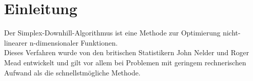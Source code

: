 \section{Einleitung}
Der Simplex-Downhill-Algorithmus ist eine Methode zur Optimierung nicht-linearer n-dimensionaler Funktionen. \\
Dieses Verfahren wurde von den britischen Statistikern John Nelder und Roger Mead entwickelt und gilt vor allem bei Problemen mit 
geringem rechnerischen Aufwand als die schnellstmögliche Methode. 
